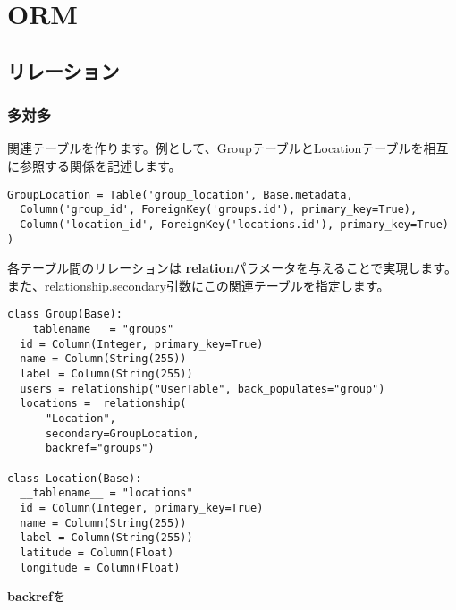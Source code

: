 \chapter{ORM}

\section{リレーション}

\subsection{多対多}

関連テーブルを作ります。例として、GroupテーブルとLocationテーブルを相互に参照する関係を記述します。

\begin{lstlisting}[caption=多対多]
GroupLocation = Table('group_location', Base.metadata,
  Column('group_id', ForeignKey('groups.id'), primary_key=True),
  Column('location_id', ForeignKey('locations.id'), primary_key=True)
)
\end{lstlisting}

各テーブル間のリレーションは \textbf{relation}パラメータを与えることで実現します。
また、relationship.secondary引数にこの関連テーブルを指定します。



\begin{lstlisting}[caption=テーブル定義]
class Group(Base):
  __tablename__ = "groups"
  id = Column(Integer, primary_key=True)
  name = Column(String(255))
  label = Column(String(255))
  users = relationship("UserTable", back_populates="group")
  locations =  relationship(
      "Location",
      secondary=GroupLocation,
      backref="groups")

class Location(Base):
  __tablename__ = "locations"
  id = Column(Integer, primary_key=True)
  name = Column(String(255))
  label = Column(String(255))
  latitude = Column(Float)
  longitude = Column(Float)
\end{lstlisting}

\textbf{backref}を
